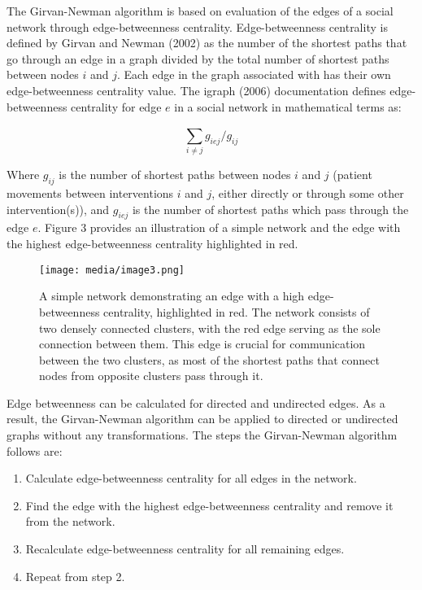 \documentclass{article}
\begin{document}
The Girvan-Newman algorithm is based on evaluation of the edges of a
social network through edge-betweenness centrality. Edge-betweenness
centrality is defined by Girvan and Newman (2002) as the number of the
shortest paths that go through an edge in a graph divided by the total
number of shortest paths between nodes \(i\) and \(j\). Each edge in the
graph associated with has their own edge-betweenness centrality value.
The igraph (2006) documentation defines edge-betweenness centrality for
edge \(e\) in a social network in mathematical terms as:

\[\sum_{i \neq j}^{}g_{iej}/g_{ij}\]

Where \(g_{ij}\) is the number of shortest paths between nodes \(i\) and
\(j\) (patient movements between interventions \(i\) and \(j\), either
directly or through some other intervention(s)), and \(g_{iej}\) is the
number of shortest paths which pass through the edge \(e\). Figure 3
provides an illustration of a simple network and the edge with the
highest edge-betweenness centrality highlighted in red.
\begin{figure}
\centering
\texttt{[image: media/image3.png]}

\caption{A simple network demonstrating an edge with a high
edge-betweenness centrality, highlighted in red. The network consists of
two densely connected clusters, with the red edge serving as the sole
connection between them. This edge is crucial for communication between
the two clusters, as most of the shortest paths that connect nodes from
opposite clusters pass through it.}
\end{figure}

Edge betweenness can be calculated for directed and undirected edges. As
a result, the Girvan-Newman algorithm can be applied to directed or
undirected graphs without any transformations. The steps the
Girvan-Newman algorithm follows are:

\begin{enumerate}
\def\labelenumi{\arabic{enumi}.}
\item
  Calculate edge-betweenness centrality for all edges in the network.
\item
  Find the edge with the highest edge-betweenness centrality and remove
  it from the network.
\item
  Recalculate edge-betweenness centrality for all remaining edges.
\item
  Repeat from step 2.
\end{enumerate}
\end{document}
